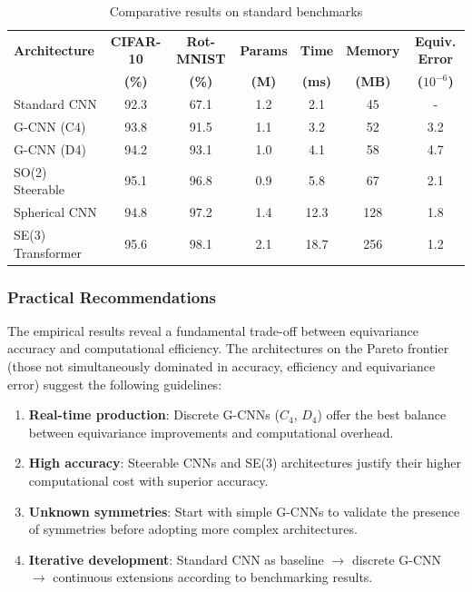 \begin{table}[h]
\centering
\footnotesize
\begin{tabular}{|l|c|c|c|c|c|c|}
\hline
\textbf{Architecture} & \textbf{CIFAR-10} & \textbf{Rot-MNIST} & \textbf{Params} & \textbf{Time} & \textbf{Memory} & \textbf{Equiv. Error} \\
 & \textbf{(\%)} & \textbf{(\%)} & \textbf{(M)} & \textbf{(ms)} & \textbf{(MB)} & \textbf{($10^{-6}$)} \\
\hline
Standard CNN & 92.3 & 67.1 & 1.2 & 2.1 & 45 & - \\
G-CNN (C4) & 93.8 & 91.5 & 1.1 & 3.2 & 52 & 3.2 \\
G-CNN (D4) & 94.2 & 93.1 & 1.0 & 4.1 & 58 & 4.7 \\
SO(2) Steerable & 95.1 & 96.8 & 0.9 & 5.8 & 67 & 2.1 \\
Spherical CNN & 94.8 & 97.2 & 1.4 & 12.3 & 128 & 1.8 \\
SE(3) Transformer & 95.6 & 98.1 & 2.1 & 18.7 & 256 & 1.2 \\
\hline
\end{tabular}
\caption{Comparative results on standard benchmarks}
\label{tab:comprehensive_benchmark_results}
\end{table}

\subsubsection{Practical Recommendations}\label{subsubsec:tradeoffs_recomendaciones}

The empirical results reveal a fundamental trade-off between equivariance accuracy and computational efficiency. The architectures on the Pareto frontier (those not simultaneously dominated in accuracy, efficiency and equivariance error) suggest the following guidelines:

\begin{enumerate}
    \item \textbf{Real-time production}: Discrete G-CNNs ($C_4$, $D_4$) offer the best balance between equivariance improvements and computational overhead.
    \item \textbf{High accuracy}: Steerable CNNs and SE(3) architectures justify their higher computational cost with superior accuracy.
    \item \textbf{Unknown symmetries}: Start with simple G-CNNs to validate the presence of symmetries before adopting more complex architectures.
    \item \textbf{Iterative development}: Standard CNN as baseline $\to$ discrete G-CNN $\to$ continuous extensions according to benchmarking results.
\end{enumerate}

